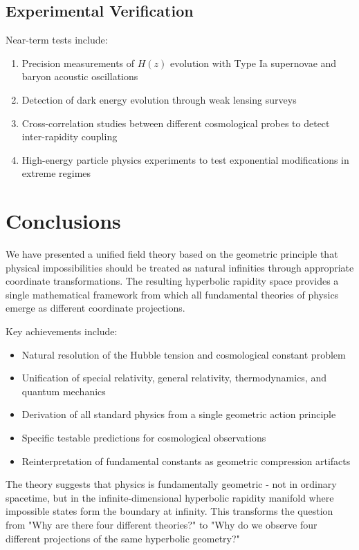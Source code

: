 \documentclass[12pt,a4paper]{article}
\begin{document}
\subsection{Experimental Verification}

Near-term tests include:
\begin{enumerate}
    \item Precision measurements of $H(z)$ evolution with Type Ia supernovae and baryon acoustic oscillations
    \item Detection of dark energy evolution through weak lensing surveys
    \item Cross-correlation studies between different cosmological probes to detect inter-rapidity coupling
    \item High-energy particle physics experiments to test exponential modifications in extreme regimes
\end{enumerate}

\section{Conclusions}

We have presented a unified field theory based on the geometric principle that physical impossibilities should be treated as natural infinities through appropriate coordinate transformations. The resulting hyperbolic rapidity space provides a single mathematical framework from which all fundamental theories of physics emerge as different coordinate projections.

Key achievements include:
\begin{itemize}
    \item Natural resolution of the Hubble tension and cosmological constant problem
    \item Unification of special relativity, general relativity, thermodynamics, and quantum mechanics
    \item Derivation of all standard physics from a single geometric action principle
    \item Specific testable predictions for cosmological observations
    \item Reinterpretation of fundamental constants as geometric compression artifacts
\end{itemize}

The theory suggests that physics is fundamentally geometric - not in ordinary spacetime, but in the infinite-dimensional hyperbolic rapidity manifold where impossible states form the boundary at infinity. This transforms the question from "Why are there four different theories?" to "Why do we observe four different projections of the same hyperbolic geometry?"
\end{document}
